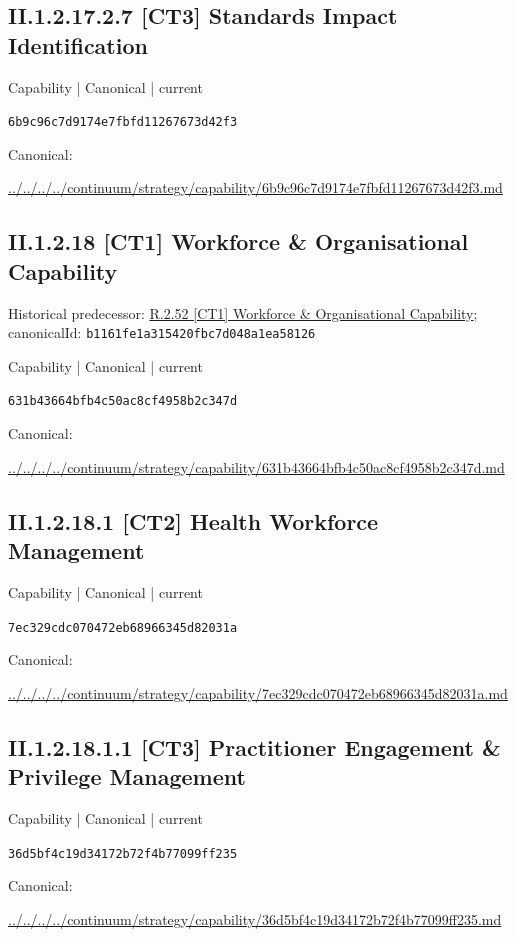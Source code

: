 \documentclass[10pt,a4paper]{article}
\begin{document}
\subsection*{II.1.2.17.2.7 [CT3] Standards Impact Identification}
\label{element-6b9c96c7d9174e7fbfd11267673d42f3}
{\small Capability | Canonical | current}\par
\texttt{6b9c96c7d9174e7fbfd11267673d42f3}\par
Canonical: \par
{\footnotesize\url{../../../../continuum/strategy/capability/6b9c96c7d9174e7fbfd11267673d42f3.md}}\par
\subsection*{II.1.2.18 [CT1] Workforce \& Organisational Capability}
Historical predecessor: \hyperref[element-b1161fe1a315420fbc7d048a1ea58126]{R.2.52 [CT1] Workforce \& Organisational Capability}; canonicalId: \texttt{b1161fe1a315420fbc7d048a1ea58126}\par
\label{element-631b43664bfb4c50ac8cf4958b2c347d}
{\small Capability | Canonical | current}\par
\texttt{631b43664bfb4c50ac8cf4958b2c347d}\par
Canonical: \par
{\footnotesize\url{../../../../continuum/strategy/capability/631b43664bfb4c50ac8cf4958b2c347d.md}}\par
\subsection*{II.1.2.18.1 [CT2] Health Workforce Management}
\label{element-7ec329cdc070472eb68966345d82031a}
{\small Capability | Canonical | current}\par
\texttt{7ec329cdc070472eb68966345d82031a}\par
Canonical: \par
{\footnotesize\url{../../../../continuum/strategy/capability/7ec329cdc070472eb68966345d82031a.md}}\par
\subsection*{II.1.2.18.1.1 [CT3] Practitioner Engagement \& Privilege Management}
\label{element-36d5bf4c19d34172b72f4b77099ff235}
{\small Capability | Canonical | current}\par
\texttt{36d5bf4c19d34172b72f4b77099ff235}\par
Canonical: \par
{\footnotesize\url{../../../../continuum/strategy/capability/36d5bf4c19d34172b72f4b77099ff235.md}}\par
\end{document}
